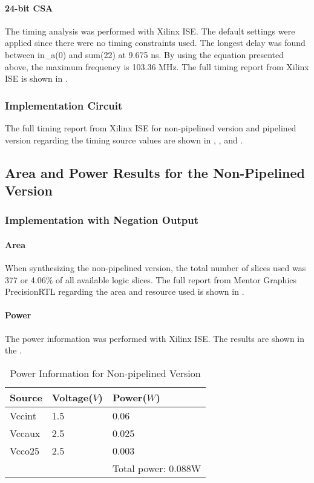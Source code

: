 \paragraph{24-bit CSA}
The timing analysis was performed with Xilinx ISE.
The default settings were applied since there were no timing constraints used.
The longest delay was found between in\_a(0) and sum(22) at 9.675 ns.
By using the equation presented above, the maximum frequency is 103.36 MHz.
The full timing report from Xilinx ISE is shown in .

\subsubsection{Implementation Circuit}
The full timing report from Xilinx ISE for non-pipelined version and pipelined version regarding
the timing source values are shown in , , and .

\subsection{Area and Power Results for the Non-Pipelined Version}
\subsubsection{Implementation with Negation Output}
\paragraph{Area}

When synthesizing the non-pipelined version, the total number of slices used was 377 or 4.06\% 
of all available logic slices. The full report from Mentor Graphics PrecisionRTL regarding the area
and resource used is shown in .

\paragraph{Power}

\noindent The power information was performed with Xilinx ISE. The results are shown in the .

\begin{table}[!ht]
	\renewcommand{\arraystretch}{1.3}
	\caption{Power Information for Non-pipelined Version}
	\centering
	\begin{tabular}{ p{4cm} p{4cm} p{4cm} }
		\hline
		\bfseries Source & \bfseries Voltage(\(V\)) & \bfseries Power(\(W\)) \\
		\hline
		Vccint           & 1.5                      & 0.06                   \\
		Vccaux           & 2.5                      & 0.025                  \\
		Vcco25           & 2.5                      & 0.003                  \\
		\hline
		                 &                          & Total power: 0.088W    \\
	\end{tabular}
	\label{tb:non_p_power}
\end{table}

